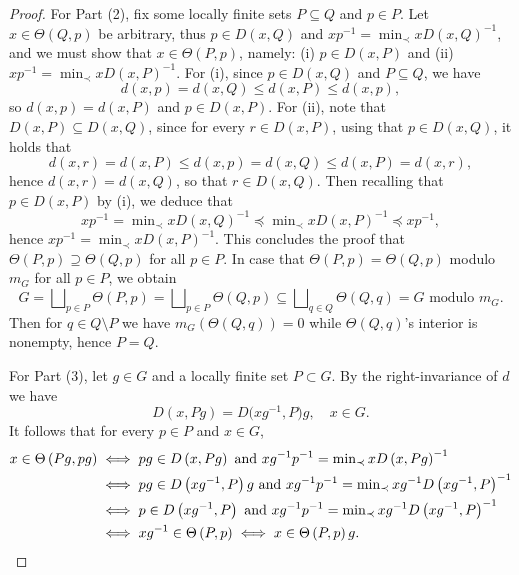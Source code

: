 \documentclass{amsart}
\numberwithin{equation}{subsection}
\theoremstyle{remark}
\begin{document}
\begin{proof}
For Part (2), fix some locally finite sets \(P\subseteq Q\) and \(p\in P\). Let \(x\in\Theta\left(Q,p\right)\) be arbitrary, thus \(p\in D\left(x,Q\right)\) and \(xp^{-1}=\min_{\prec}xD\left(x,Q\right)^{-1}\), and we must show that \(x\in\Theta\left(P,p\right)\), namely: (i) \(p\in D\left(x,P\right)\) and (ii) \(xp^{-1}=\min_{\prec}xD\left(x,P\right)^{-1}\). For (i), since \(p\in D\left(x,Q\right)\) and \(P\subseteq Q\), we have
\[d\left(x,p\right)=d\left(x,Q\right)\leq d\left(x,P\right)\leq d\left(x,p\right),\]
so \(d\left(x,p\right)=d\left(x,P\right)\)
and \(p\in D\left(x,P\right)\). For (ii), note that \(D\left(x,P\right)\subseteq D\left(x,Q\right)\), since for every \(r\in D\left(x,P\right)\), using that \(p\in D\left(x,Q\right)\), it holds that
\[d\left(x,r\right)=d\left(x,P\right)\leq d\left(x,p\right)=d\left(x,Q\right)\leq d\left(x,P\right)=d\left(x,r\right),\]
hence \(d\left(x,r\right)=d\left(x,Q\right)\), so that \(r\in D\left(x,Q\right)\). Then recalling that \(p\in D\left(x,P\right)\) by (i), we deduce that
\[xp^{-1}=\min\nolimits_{\prec}xD\left(x,Q\right)^{-1}\preccurlyeq\min\nolimits_{\prec}xD\left(x,P\right)^{-1}\preccurlyeq xp^{-1},\]
hence \(xp^{-1}=\min_{\prec}xD\left(x,P\right)^{-1}\). This concludes the proof that \(\Theta\left(P,p\right)\supseteq\Theta\left(Q,p\right)\) for all \(p\in P\). In case that \(\Theta\left(P,p\right)=\Theta\left(Q,p\right)\) modulo \(m_{G}\) for all \(p\in P\), we obtain
\[G=\bigsqcup\nolimits_{p\in P}\Theta\left(P,p\right)=\bigsqcup\nolimits_{p\in P}\Theta\left(Q,p\right)\subseteq\bigsqcup\nolimits_{q\in Q}\Theta\left(Q,q\right)=G\text{ modulo }m_{G}.\]
Then for \(q\in Q\setminus P\) we have \(m_{G}\left(\Theta\left(Q,q\right)\right)=0\) while \(\Theta\left(Q,q\right)\)'s interior is nonempty, hence \(P=Q\).

For Part (3), let \(g\in G\) and a locally finite set \(P\subset G\). By the right-invariance of \(d\) we have
\[D\left(x,Pg\right)=D\big(xg^{-1},P\big)g,\quad x\in G.\]
It follows that for every \(p\in P\) and \(x\in G\),
\begin{align*}
x\in\Theta\left(Pg,pg\right)
&\iff pg\in D\left(x,Pg\right)\text{ and }xg^{-1}p^{-1}=\min\nolimits_{\prec}xD\left(x,Pg\right)^{-1}\\
&\iff pg\in D\left(xg^{-1},P\right)g\text{ and }xg^{-1}p^{-1}=\min\nolimits_{\prec}xg^{-1}D\left(xg^{-1},P\right)^{-1}\\
&\iff p\in D\left(xg^{-1},P\right)\text{ and }xg^{-1}p^{-1}=\min\nolimits_{\prec}xg^{-1}D\left(xg^{-1},P\right)^{-1}\\
&\iff xg^{-1}\in\Theta\left(P,p\right)\iff x\in\Theta\left(P,p\right)g.\qedhere
\end{align*}
\end{proof}
\end{document}
